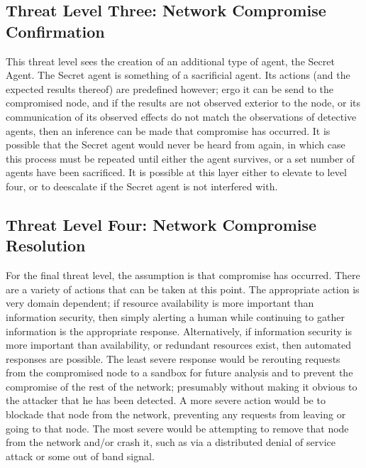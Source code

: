 \documentclass{acm_proc_article-sp}
\begin{document}
\subsection{Threat Level Three: Network Compromise Confirmation}
This threat level sees the creation of an additional type of agent, the Secret Agent.  The Secret agent is something of a sacrificial agent.  Its actions (and the expected results thereof) are predefined however; ergo it can be send to the compromised node, and if the results are not observed exterior to the node, or its communication of its observed effects do not match the observations of detective agents, then an inference can be made that compromise has occurred.  It is possible that the Secret agent would never be heard from again, in which case this process must be repeated until either the agent survives, or a set number of agents have been sacrificed.  It is possible at this layer either to elevate to level four, or to deescalate if the Secret agent is not interfered with.

\subsection{Threat Level Four: Network Compromise Resolution}
For the final threat level, the assumption is that compromise has occurred.  There are a variety of actions that can be taken at this point.  The appropriate action is very domain dependent; if resource availability is more important than information security, then simply alerting a human while continuing to gather information is the appropriate response.  Alternatively, if information security is more important than availability, or redundant resources exist, then automated responses are possible.  The least severe response would be rerouting requests from the compromised node to a sandbox for future analysis and to prevent the compromise of the rest of the network; presumably without making it obvious to the attacker that he has been detected.  A more severe action would be to blockade that node from the network, preventing any requests from leaving or going to that node.  The most severe would be attempting to remove that node from the network and/or crash it, such as via a distributed denial of service attack or some out of band signal.  
\end{document}
